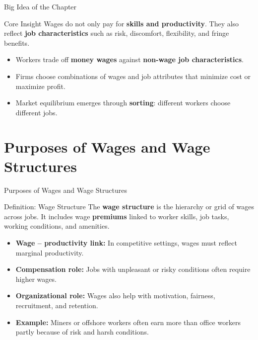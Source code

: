 \documentclass[aspectratio=169]{beamer}
\begin{document}
\begin{frame}{Big Idea of the Chapter}
\transfade
\begin{block}{Core Insight}
Wages do not only pay for \textbf{skills and productivity}. They also reflect \textbf{job characteristics} such as risk, discomfort, flexibility, and fringe benefits.
\end{block}
\begin{itemize}
  \item Workers trade off \textbf{money wages} against \textbf{non-wage job characteristics}.
  \item Firms choose combinations of wages and job attributes that minimize cost or maximize profit.
  \item Market equilibrium emerges through \textbf{sorting}: different workers choose different jobs.
\end{itemize}
\end{frame}

\section{Purposes of Wages and Wage Structures}

\begin{frame}{Purposes of Wages and Wage Structures}
\transfade
\begin{block}{Definition: Wage Structure}
The \textbf{wage structure} is the hierarchy or grid of wages across jobs. It includes wage \textbf{premiums} linked to worker skills, job tasks, working conditions, and amenities.
\end{block}
\begin{itemize}
  \item \textbf{Wage -- productivity link:} In competitive settings, wages must reflect marginal productivity.
  \item \textbf{Compensation role:} Jobs with unpleasant or risky conditions often require higher wages.
  \item \textbf{Organizational role:} Wages also help with motivation, fairness, recruitment, and retention.
  \item \textbf{Example:} Miners or offshore workers often earn more than office workers partly because of risk and harsh conditions.
\end{itemize}
\end{frame}
\end{document}
